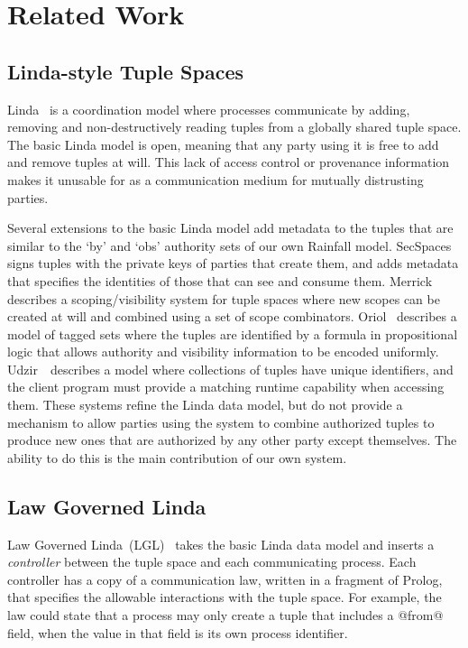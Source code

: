 
\label{s:Related}
\section{Related Work}

\subsection{Linda-style Tuple Spaces}
Linda~\cite{Gelernter1985:Linda} is a coordination model where processes communicate by adding, removing and non-destructively reading tuples from a globally shared tuple space. The basic Linda model is open, meaning that any party using it is free to add and remove tuples at will. This lack of access control or provenance information makes it unusable for as a communication medium for mutually distrusting parties.

Several extensions to the basic Linda model add metadata to the tuples that are similar to the `by' and `obs' authority sets of our own Rainfall model. SecSpaces~\cite{Busi2003:SecSpaces} signs tuples with the private keys of parties that create them, and adds metadata that specifies the identities of those that can see and consume them. Merrick~\cite{Merrick2000:Scopes} describes a scoping/visibility system for tuple spaces where new scopes can be created at will and combined using a set of scope combinators. Oriol~\cite{Oriol2005:TaggedSets} describes a model of tagged sets where the tuples are identified by a formula in propositional logic that allows authority and visibility information to be encoded uniformly. Udzir~\cite{Udzir2007:MultiCapabilities}~describes a model where collections of tuples have unique identifiers, and the client program must provide a matching runtime capability when accessing them. These systems refine the Linda data model, but do not provide a mechanism to allow parties using the system to combine authorized tuples to produce new ones that are authorized by any other party except themselves. The ability to do this is the main contribution of our own system.


\subsection{Law Governed Linda}
Law Governed Linda~(LGL)~\cite{Minsky1994:LawGovernedLinda, Minsky2001:SafeTupleSpace} takes the basic Linda data model and inserts a \emph{controller} between the tuple space and each communicating process. Each controller has a copy of a communication law, written in a fragment of Prolog, that specifies the allowable interactions with the tuple space. For example, the law could  state that a process may only create a tuple that includes a @from@ field, when the value in that field is its own process identifier.

